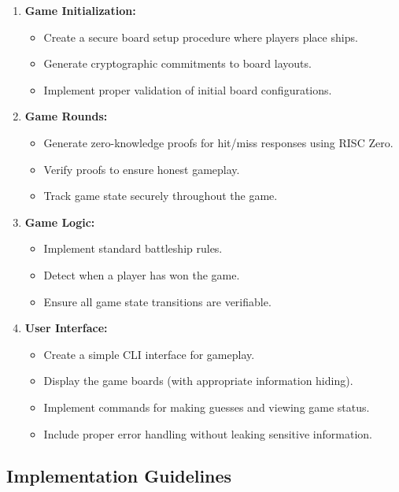 \documentclass[10pt,a4paper,american]{article}
\begin{document}
\begin{enumerate}
	\item \textbf{Game Initialization:}
	      \begin{itemize}
		      \item Create a secure board setup procedure where players place ships.
		      \item Generate cryptographic commitments to board layouts.
		      \item Implement proper validation of initial board configurations.
	      \end{itemize}

	\item \textbf{Game Rounds:}
	      \begin{itemize}
		      \item Generate zero-knowledge proofs for hit/miss responses using RISC Zero.
		      \item Verify proofs to ensure honest gameplay.
		      \item Track game state securely throughout the game.
	      \end{itemize}

	\item \textbf{Game Logic:}
	      \begin{itemize}
		      \item Implement standard battleship rules.
		      \item Detect when a player has won the game.
		      \item Ensure all game state transitions are verifiable.
	      \end{itemize}

	\item \textbf{User Interface:}
	      \begin{itemize}
		      \item Create a simple CLI interface for gameplay.
		      \item Display the game boards (with appropriate information hiding).
		      \item Implement commands for making guesses and viewing game status.
		      \item Include proper error handling without leaking sensitive information.
	      \end{itemize}
\end{enumerate}

\subsection*{Implementation Guidelines}
\end{document}
